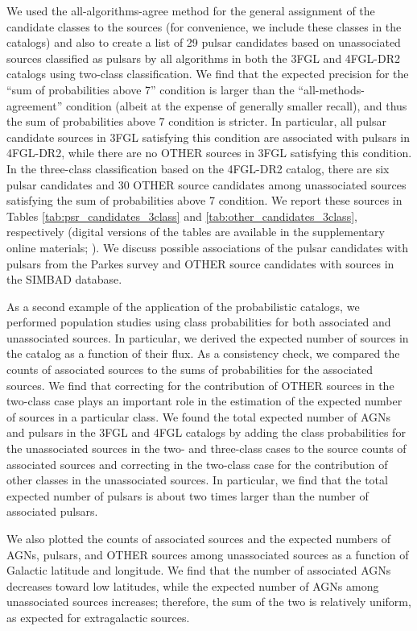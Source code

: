 \documentclass[referee]{aa} %
\begin{document}
We used the all-algorithms-agree method for the general assignment of the candidate classes to the sources (for convenience, we include these classes in the catalogs) and also to create a list of 29 pulsar candidates based on unassociated sources classified as pulsars by all algorithms in both the 3FGL and 4FGL-DR2 catalogs using two-class classification.
We find that the expected precision for the ``sum of probabilities above 7'' condition is larger than the ``all-methods-agreement'' condition (albeit at the expense of generally smaller recall), and thus the sum of probabilities above 7 condition is stricter.
In particular, all pulsar candidate sources in 3FGL satisfying this condition are associated with pulsars in 4FGL-DR2, while there are no OTHER sources in 3FGL satisfying this condition. In the three-class classification based on the 4FGL-DR2 catalog, there are six pulsar candidates and 30 OTHER source candidates among unassociated sources satisfying  the sum of probabilities above 7 condition. 
We report these sources in Tables \ref{tab:psr_candidates_3class} and \ref{tab:other_candidates_3class}, respectively (digital versions of the tables are available in the supplementary online materials; \citealt{SOM_material}). We discuss possible associations of the pulsar candidates with pulsars from the Parkes survey \citep{Camilo2015} and OTHER source candidates with sources in the SIMBAD database.

As a second example of the application of the probabilistic catalogs, we performed population studies using class probabilities for both associated and unassociated sources.
In particular, we derived the expected number of sources in the catalog as a function of their flux.
As a consistency check, we compared the counts of associated sources to the sums of probabilities for the associated sources.
We find that correcting for the contribution of OTHER sources in the two-class case plays an important role in the estimation of the expected number of sources in a particular class.
We found the total expected number of AGNs and pulsars in the 3FGL and 4FGL catalogs by adding the class probabilities for the unassociated sources in the two- and three-class cases to the source counts of associated sources and correcting in the two-class case for the contribution of other classes in the unassociated sources.
In particular, we find that the total expected number of pulsars is about two times larger than the number of associated pulsars.

We also plotted the counts of associated sources and the expected numbers of AGNs, pulsars, and OTHER sources among unassociated sources
as a function of Galactic latitude and longitude.
We find that the number of associated AGNs decreases toward low latitudes, while the expected number of AGNs among unassociated sources increases; therefore, the sum of the two is relatively uniform, as expected for extragalactic sources.
\end{document}
